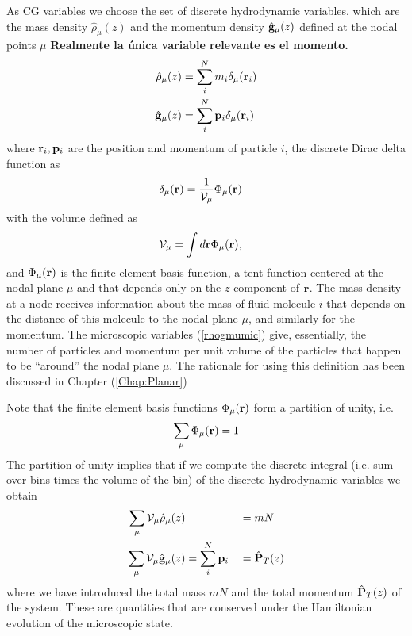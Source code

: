 \documentclass[a4paper,openright,12pt]{book}
\newcommand{\Note}[1]{{\bf \color{red}#1}}    %
\begin{document}
As CG variables we choose  the set of discrete hydrodynamic
variables,  which are  the  mass density  $\hat{\rho}_\mu(z)$ and  the
momentum  density $\hat{\bf  g}_\mu(z)$  defined at  the nodal  points
$\mu$   \Note{Realmente la única variable relevante es el momento.}
\begin{align}
\hat{\rho}_\mu(z)&= \sum_i^Nm_i\delta_\mu({\bf r}_i)
\nonumber\\
\hat{\bf g}_\mu(z)&= \sum_i^N{\bf p}_i\delta_\mu({\bf r}_i)
\label{rhogmumic}
\end{align}
where ${\bf r}_i,{\bf p}_i$ are the position and momentum of particle $i$, 
 the discrete Dirac delta function as 
\begin{align}
\delta_\mu({\bf r})&=  \frac{1}{{\cal V}_\mu}\Phi_\mu({\bf r})
\label{delta}
\end{align}
with the volume defined as
\begin{align}
  {\cal V}_\mu&=\int d{\bf r}\Phi_\mu({\bf r}),
\end{align}
and $\Phi_\mu({\bf r})$  is the finite element basis  function, a tent
function centered  at the nodal plane  $\mu$ and that depends  only on
the $z$ component  of ${\bf r}$.  The mass density  at a node receives
information about the  mass of fluid molecule $i$ that  depends on the
distance of this molecule to the  nodal plane $\mu$, and similarly for
the  momentum.   The  microscopic  variables  (\ref{rhogmumic})  give,
essentially, the number  of particles and momentum per  unit volume of
the particles that happen to be ``around'' the nodal plane $\mu$.  The rationale for using this definition has been discussed in Chapter (\ref{Chap:Planar})


Note that the finite  element basis  functions $\Phi_\mu({\bf  r})$  form a
partition of unity, i.e.
\begin{align}
  \sum_\mu\Phi_\mu({\bf r})=1
\label{PartUnit}
\end{align}
The  partition  of unity  implies  that  if  we compute  the  discrete
integral  (i.e. sum  over bins  times the  volume of  the bin)  of the
discrete hydrodynamic variables we obtain
\begin{align}
  \sum_\mu{\cal V}_\mu\hat{\rho}_\mu(z)&  &&= mN
\nonumber\\
  \sum_\mu{\cal V}_\mu\hat{\bf g}_\mu(z)&=\sum_i^N{\bf p}_i&&= \hat{\bf P}_T(z)
\label{DiscCons}
\end{align}
where we  have introduced the total  mass $mN$ and the  total momentum
$\hat{\bf  P}_T(z)$ of  the  system.  These  are  quantities that  are
conserved under  the Hamiltonian  evolution of the  microscopic state.
\end{document}
